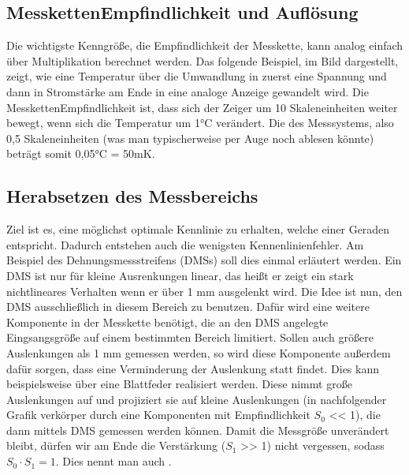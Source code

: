 \documentclass[letterpaper,10pt,english]{jupyterBook}
\begin{document}
\subsection{Messketten\sphinxhyphen{}Empfindlichkeit und Auflösung}
\label{\detokenize{content/2_realeKennlinie:messketten-empfindlichkeit-und-auflosung}}
\sphinxAtStartPar


\sphinxAtStartPar
Die wichtigste Kenngröße, die Empfindlichkeit der Messkette, kann analog einfach über Multiplikation berechnet werden. Das folgende Beispiel, im Bild dargestellt, zeigt, wie eine Temperatur über die Umwandlung in zuerst eine Spannung und dann in Stromstärke am Ende in eine analoge Anzeige gewandelt wird. Die Messketten\sphinxhyphen{}Empfindlichkeit ist, dass sich der Zeiger um 10 Skaleneinheiten weiter bewegt, wenn sich die Temperatur um 1°C verändert. Die  des Messsystems, also 0,5 Skaleneinheiten (was man typischerweise per Auge noch ablesen könnte) beträgt somit 0,05°C = 50mK.

\sphinxAtStartPar
{}


\subsection{Herabsetzen des Messbereichs}
\label{\detokenize{content/2_realeKennlinie:herabsetzen-des-messbereichs}}
\sphinxAtStartPar


\sphinxAtStartPar
Ziel ist es, eine möglichst optimale Kennlinie zu erhalten, welche einer Geraden entspricht. Dadurch entstehen auch die wenigsten Kennenlinienfehler. Am Beispiel des Dehnungsmessstreifens (DMSs) soll dies einmal erläutert werden. Ein DMS ist nur für kleine Ausrenkungen linear, das heißt er zeigt ein stark nicht\sphinxhyphen{}lineares Verhalten wenn er über 1 mm ausgelenkt wird. Die Idee ist nun, den DMS ausschließlich in diesem Bereich zu benutzen. Dafür wird eine weitere Komponente in der Messkette benötigt, die an den DMS angelegte Eingsangsgröße auf einem bestimmten Bereich limitiert. Sollen auch größere Auslenkungen als 1 mm gemessen werden, so wird diese Komponente außerdem dafür sorgen, dass eine Verminderung der Auslenkung statt findet. Dies kann beispielsweise über eine Blattfeder realisiert werden. Diese nimmt große Auslenkungen auf und projiziert sie auf kleine Auslenkungen (in nachfolgender Grafik verkörper durch eine Komponenten mit Empfindlichkeit \(S_0\) << 1), die dann mittels DMS gemessen werden können. Damit die Messgröße unverändert bleibt, dürfen wir am Ende die Verstärkung (\(S_1\) >> 1) nicht vergessen, sodass \(S_0 \cdot S_1 = 1\). Dies nennt man auch .
\end{document}
